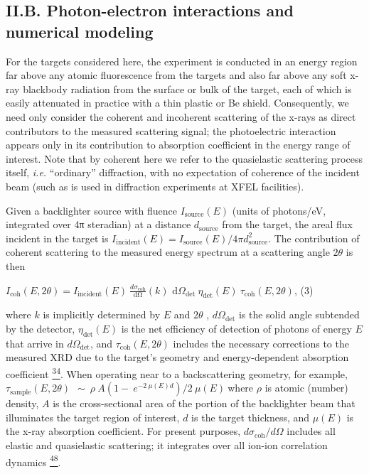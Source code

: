 \subsection{II.B. Photon-electron interactions and numerical modeling }

For the targets considered here, the experiment is conducted in an
energy region far above any atomic fluorescence from the targets and
also far above any soft x-ray blackbody radiation from the surface or
bulk of the target, each of which is easily attenuated in practice with
a thin plastic or Be shield. Consequently, we need only consider the
coherent and incoherent scattering of the x-rays as direct contributors
to the measured scattering signal; the photoelectric interaction appears
only in its contribution to absorption coefficient in the energy range
of interest. Note that by coherent here we refer to the quasielastic
scattering process itself, \emph{i.e.} ``ordinary'' diffraction, with no
expectation of coherence of the incident beam (such as is used in
diffraction experiments at XFEL facilities).

Given a backlighter source with fluence
\(I_{\text{source}}\left( E \right)\) (units of photons/eV, integrated
over 4π steradian) at a distance \(d_{\text{sour}\text{ce}}\) from the
target, the areal flux incident in the target is
\(I_{\text{incident}}\left( E \right) = I_{\text{source}}\left( E \right)/4\pi d_{\text{source}}^{2}\).
The contribution of coherent scattering to the measured energy spectrum
at a scattering angle \(2\theta\) is then

\(I_{\text{coh}}\left( E,2\theta \right) = I_{\text{incident}}\left( E \right)\ \frac{d\sigma_{\text{coh}}}{\text{dΩ}}\left( k \right)\text{\ d}\Omega_{\det}\ \eta_{\det}\left( E \right)\ \tau_{\text{coh}}\left( E,2\theta \right)\),
(3)

where \(k\) is implicitly determined by \(E\) and \(2\theta\) ,
\(d\Omega_{\det}\) is the solid angle subtended by the detector,
\(\eta_{\det}\left( E \right)\) is the net efficiency of detection of
photons of energy \(E\) that arrive in \(d\Omega_{\det}\), and
\(\tau_{\text{coh}}\left( E,2\theta \right)\) includes the necessary
corrections to the measured XRD due to the target's geometry and
energy-dependent absorption coefficient
\hyperref[j.-l.-bourgade-et-al.-review-of-scientific-instruments-75-4204-2004.]{\textsuperscript{34}}.
When operating near to a backscattering geometry, for example,
\(\tau_{\text{sample}}\left( E,2\theta \right)\ \ \sim\ \rho\ A(1 - \ e^{- 2\ \mu\left( E \right)d})/2\ \mu(E)\ \)where
\(\rho\) is atomic (number) density, \(A\) is the cross-sectional area
of the portion of the backlighter beam that illuminates the target
region of interest, \(d\) is the target thickness, and
\(\mu\left( E \right)\) is the x-ray absorption coefficient. For present
purposes, \(d\sigma_{\text{coh}}/d\Omega\) includes all elastic and
quasielastic scattering; it integrates over all ion-ion correlation
dynamics
\hyperref[g.-gregori-and-d.-o.-gericke-physics-of-plasmas-16-056306-2009.]{\textsuperscript{48}}.

